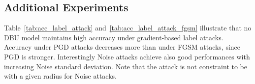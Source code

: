 \newpage 
\subsection{Additional Experiments}



Table~\ref{tab:acc_label_attack} and~\ref{tab:acc_label_attack_fgsm} illustrate that no DBU model maintains high accuracy under gradient-based label attacks. Accuracy under PGD attacks decreases more than under FGSM attacks, since PGD is stronger.  Interestingly Noise attacks achieve also good performances with increasing Noise standard deviation. Note that the attack is not constraint to be with a given radius for Noise attacks.



\begin{table}[htbp!]
 	\centering
 	\caption{Accuracy under PGD label attacks.}
 	\begin{small}
\end{small}
\end{table}
